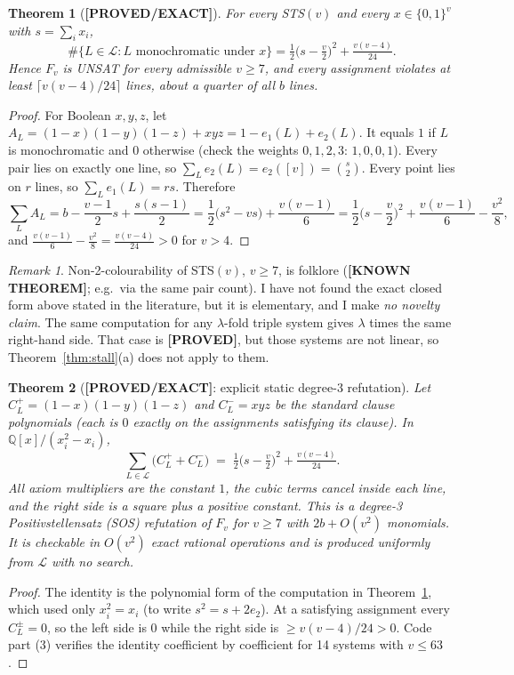 \documentclass[11pt]{article}
\newtheorem{theorem}{Theorem}
\theoremstyle{definition}
\theoremstyle{remark}
\newtheorem{remark}{Remark}
\newcommand{\lab}[1]{\textbf{[#1]}}
\begin{document}
\begin{theorem}[\lab{PROVED/EXACT}]\label{thm:mono}
For every STS$(v)$ and every $x\in\{0,1\}^v$ with $s=\sum_ix_i$,
\[\#\{L\in\mathcal L: L\text{ monochromatic under }x\}=\tfrac12\bigl(s-\tfrac v2\bigr)^2+\tfrac{v(v-4)}{24}.\]
Hence $F_v$ is UNSAT for every admissible $v\ge7$, and every assignment violates at least
$\lceil v(v-4)/24\rceil$ lines, about a quarter of all $b$ lines.
\end{theorem}
\begin{proof}
For Boolean $x,y,z$, let $A_L=(1-x)(1-y)(1-z)+xyz=1-e_1(L)+e_2(L)$. It equals $1$ if $L$
is monochromatic and $0$ otherwise (check the weights $0,1,2,3$: $1,0,0,1$). Every pair lies
on exactly one line, so $\sum_Le_2(L)=e_2([v])=\binom s2$. Every point lies on $r$ lines,
so $\sum_Le_1(L)=rs$. Therefore
\[\textstyle\sum_LA_L=b-\frac{v-1}2s+\frac{s(s-1)}2=\frac12\bigl(s^2-vs\bigr)+\frac{v(v-1)}6
=\frac12\bigl(s-\frac v2\bigr)^2+\frac{v(v-1)}6-\frac{v^2}8,\]
and $\frac{v(v-1)}6-\frac{v^2}8=\frac{v(v-4)}{24}>0$ for $v>4$.
\end{proof}
\begin{remark}
Non-2-colourability of STS$(v)$, $v\ge7$, is folklore (\lab{KNOWN THEOREM}; e.g.\ via the
same pair count). I have not found the exact closed form above stated in the literature,
but it is elementary, and I make \emph{no novelty claim}. The same computation for any
$\lambda$-fold triple system gives $\lambda$ times the same right-hand side. That case is
\lab{PROVED}, but those systems are not linear, so Theorem~\ref{thm:stall}(a) does not
apply to them.
\end{remark}

\begin{theorem}[\lab{PROVED/EXACT}: explicit static degree-3 refutation]\label{thm:cert}
Let $C^+_L=(1-x)(1-y)(1-z)$ and $C^-_L=xyz$ be the standard clause polynomials (each is
$0$ exactly on the assignments satisfying its clause). In $\mathbb Q[x]/(x_i^2-x_i)$,
\[\sum_{L\in\mathcal L}\bigl(C^+_L+C^-_L\bigr)\;=\;\tfrac12\bigl(s-\tfrac v2\bigr)^2+\tfrac{v(v-4)}{24}.\]
All axiom multipliers are the constant $1$, the cubic terms cancel inside each line, and
the right side is a square plus a positive constant. This is a degree-3 Positivstellensatz
(SOS) refutation of $F_v$ for $v\ge7$ with $2b+O(v^2)$ monomials. It is checkable in
$O(v^2)$ exact rational operations and is produced uniformly from $\mathcal L$ with no
search.
\end{theorem}
\begin{proof}
The identity is the polynomial form of the computation in Theorem~\ref{thm:mono}, which
used only $x_i^2=x_i$ (to write $s^2=s+2e_2$). At a satisfying assignment every
$C^\pm_L=0$, so the left side is $0$ while the right side is $\ge v(v-4)/24>0$.
Code part (3) verifies the identity coefficient by coefficient for 14 systems with
$v\le63$.
\end{proof}
\end{document}
